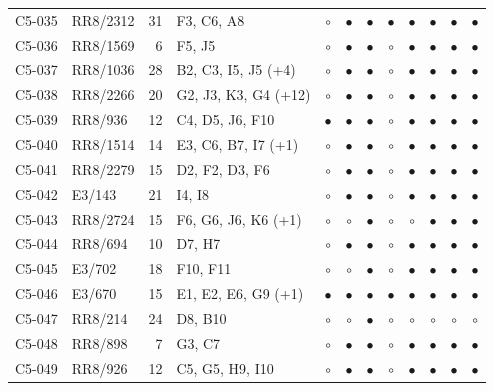 {\begin{longtable}{llrp{3.9cm}cccccccc}
    C5-035 & RR8/2312 & 31 & F3, C6, A8 & $\circ$ & $\bullet$ & $\bullet$ & $\bullet$ & $\bullet$ & $\bullet$ & $\bullet$ & $\bullet$ \\
    C5-036 & RR8/1569 & 6 & F5, J5 & $\circ$ & $\bullet$ & $\bullet$ & $\circ$ & $\bullet$ & $\bullet$ & $\bullet$ & $\bullet$ \\
    C5-037 & RR8/1036 & 28 & B2, C3, I5, J5 (+4) & $\circ$ & $\bullet$ & $\bullet$ & $\circ$ & $\bullet$ & $\bullet$ & $\bullet$ & $\bullet$ \\
    C5-038 & RR8/2266 & 20 & G2, J3, K3, G4 (+12) & $\circ$ & $\bullet$ & $\bullet$ & $\circ$ & $\bullet$ & $\bullet$ & $\bullet$ & $\bullet$ \\
    C5-039 & RR8/936 & 12 & C4, D5, J6, F10 & $\bullet$ & $\bullet$ & $\bullet$ & $\circ$ & $\bullet$ & $\bullet$ & $\bullet$ & $\bullet$ \\
    C5-040 & RR8/1514 & 14 & E3, C6, B7, I7 (+1) & $\circ$ & $\bullet$ & $\bullet$ & $\circ$ & $\bullet$ & $\bullet$ & $\bullet$ & $\bullet$ \\
    C5-041 & RR8/2279 & 15 & D2, F2, D3, F6 & $\circ$ & $\bullet$ & $\bullet$ & $\circ$ & $\bullet$ & $\bullet$ & $\bullet$ & $\bullet$ \\
    C5-042 & E3/143 & 21 & I4, I8 & $\circ$ & $\bullet$ & $\bullet$ & $\circ$ & $\bullet$ & $\bullet$ & $\bullet$ & $\bullet$ \\
    C5-043 & RR8/2724 & 15 & F6, G6, J6, K6 (+1) & $\circ$ & $\circ$ & $\bullet$ & $\circ$ & $\circ$ & $\bullet$ & $\bullet$ & $\bullet$ \\
    C5-044 & RR8/694 & 10 & D7, H7 & $\circ$ & $\bullet$ & $\bullet$ & $\circ$ & $\bullet$ & $\bullet$ & $\bullet$ & $\bullet$ \\
    C5-045 & E3/702 & 18 & F10, F11 & $\circ$ & $\circ$ & $\bullet$ & $\circ$ & $\bullet$ & $\bullet$ & $\bullet$ & $\bullet$ \\
    C5-046 & E3/670 & 15 & E1, E2, E6, G9 (+1) & $\bullet$ & $\bullet$ & $\bullet$ & $\bullet$ & $\bullet$ & $\bullet$ & $\bullet$ & $\bullet$ \\
    C5-047 & RR8/214 & 24 & D8, B10 & $\circ$ & $\circ$ & $\bullet$ & $\circ$ & $\circ$ & $\circ$ & $\circ$ & $\circ$ \\
    C5-048 & RR8/898 & 7 & G3, C7 & $\circ$ & $\bullet$ & $\bullet$ & $\circ$ & $\bullet$ & $\bullet$ & $\bullet$ & $\bullet$ \\
    C5-049 & RR8/926 & 12 & C5, G5, H9, I10 & $\circ$ & $\bullet$ & $\bullet$ & $\circ$ & $\bullet$ & $\bullet$ & $\bullet$ & $\bullet$ \\

\end{longtable}}
